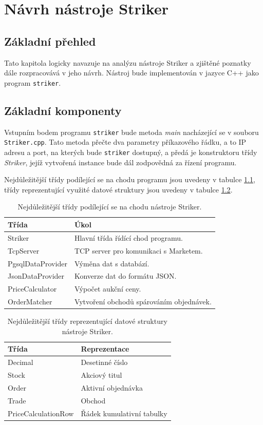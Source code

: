 \documentclass[thesis=M,czech]{FITthesis}[2012/06/26]
\begin{document}
\chapter{Návrh nástroje Striker}


\section{Základní přehled}

Tato kapitola logicky navazuje na analýzu nástroje Striker a zjištěné poznatky dále rozpracovává v jeho návrh.
Nástroj bude implementován v jazyce C++ jako program \texttt{striker}.



\section{Základní komponenty}

Vstupním bodem programu \texttt{striker} bude metoda \textit{main} nacházející se v souboru \texttt{Striker.cpp}. 
Tato metoda přečte dva parametry příkazového řádku, a to IP adresu a port, na kterých bude \texttt{striker} dostupný, 
a předá je konstruktoru třídy \textit{Striker}, jejíž vytvořená instance bude dál zodpovědná za řízení programu.

Nejdůležitější třídy podílející se na chodu programu jsou uvedeny v tabulce \ref{tab:apclsmain}, třídy reprezentující využité datové 
struktury jsou uvedeny v tabulce \ref{tab:apclssup}.

\begin{table}\centering
	\begin{tabular}{| l | l |}\hline
		Třída			& Úkol								\tabularnewline \hline \hline
		Striker	 		& Hlavní třída řídící chod programu.			\tabularnewline \hline
		TcpServer		& TCP server pro komunikaci s Marketem.		\tabularnewline \hline
		PgsqlDataProvider	& Výměna dat s databází.					\tabularnewline \hline
		JsonDataProvider	& Konverze dat do formátu JSON.			\tabularnewline \hline
		PriceCalculator	& Výpočet aukční ceny.					\tabularnewline \hline
		OrderMatcher	& Vytvoření obchodů spárováním objednávek.		\tabularnewline \hline
	\end{tabular}
	\caption[Hlavní třídy programu]{Nejdůležitější třídy podílející se na chodu nástroje Striker.}
	\label{tab:apclsmain}
\end{table}

\begin{table}\centering
	\begin{tabular}{| l | l |}\hline
		Třída				& Reprezentace			\tabularnewline \hline \hline
		Decimal 			& Desetinné číslo			\tabularnewline \hline
		Stock	 			& Akciový titul			\tabularnewline \hline
		Order	 			& Aktivní objednávka		\tabularnewline \hline
		Trade	 			& Obchod				\tabularnewline \hline
		PriceCalculationRow	& Řádek kumulativní tabulky	\tabularnewline \hline
	\end{tabular}
	\caption[Hlavní datové třídy programu]{Nejdůležitější třídy reprezentující datové struktury nástroje Striker.}
	\label{tab:apclssup}
\end{table}
\end{document}
